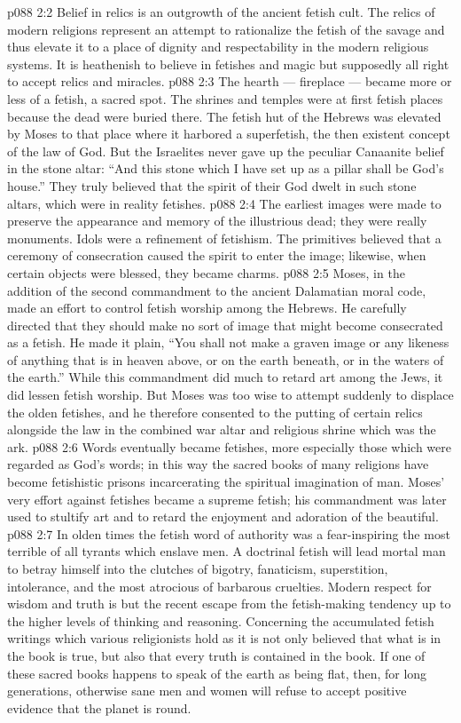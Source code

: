 \vs p088 2:2 Belief in relics is an outgrowth of the ancient fetish cult. The relics of modern religions represent an attempt to rationalize the fetish of the savage and thus elevate it to a place of dignity and respectability in the modern religious systems. It is heathenish to believe in fetishes and magic but supposedly all right to accept relics and miracles.
\vs p088 2:3 The hearth --- fireplace --- became more or less of a fetish, a sacred spot. The shrines and temples were at first fetish places because the dead were buried there. The fetish hut of the Hebrews was elevated by Moses to that place where it harbored a superfetish, the then existent concept of the law of God. But the Israelites never gave up the peculiar Canaanite belief in the stone altar: “And this stone which I have set up as a pillar shall be God’s house.” They truly believed that the spirit of their God dwelt in such stone altars, which were in reality fetishes.
\vs p088 2:4 \pc The earliest images were made to preserve the appearance and memory of the illustrious dead; they were really monuments. Idols were a refinement of fetishism. The primitives believed that a ceremony of consecration caused the spirit to enter the image; likewise, when certain objects were blessed, they became charms.
\vs p088 2:5 Moses, in the addition of the second commandment to the ancient Dalamatian moral code, made an effort to control fetish worship among the Hebrews. He carefully directed that they should make no sort of image that might become consecrated as a fetish. He made it plain, “You shall not make a graven image or any likeness of anything that is in heaven above, or on the earth beneath, or in the waters of the earth.” While this commandment did much to retard art among the Jews, it did lessen fetish worship. But Moses was too wise to attempt suddenly to displace the olden fetishes, and he therefore consented to the putting of certain relics alongside the law in the combined war altar and religious shrine which was the ark.
\vs p088 2:6 \pc Words eventually became fetishes, more especially those which were regarded as God’s words; in this way the sacred books of many religions have become fetishistic prisons incarcerating the spiritual imagination of man. Moses’ very effort against fetishes became a supreme fetish; his commandment was later used to stultify art and to retard the enjoyment and adoration of the beautiful.
\vs p088 2:7 In olden times the fetish word of authority was a fear\hyp{}inspiring  the most terrible of all tyrants which enslave men. A doctrinal fetish will lead mortal man to betray himself into the clutches of bigotry, fanaticism, superstition, intolerance, and the most atrocious of barbarous cruelties. Modern respect for wisdom and truth is but the recent escape from the fetish\hyp{}making tendency up to the higher levels of thinking and reasoning. Concerning the accumulated fetish writings which various religionists hold as  it is not only believed that what is in the book is true, but also that every truth is contained in the book. If one of these sacred books happens to speak of the earth as being flat, then, for long generations, otherwise sane men and women will refuse to accept positive evidence that the planet is round.
